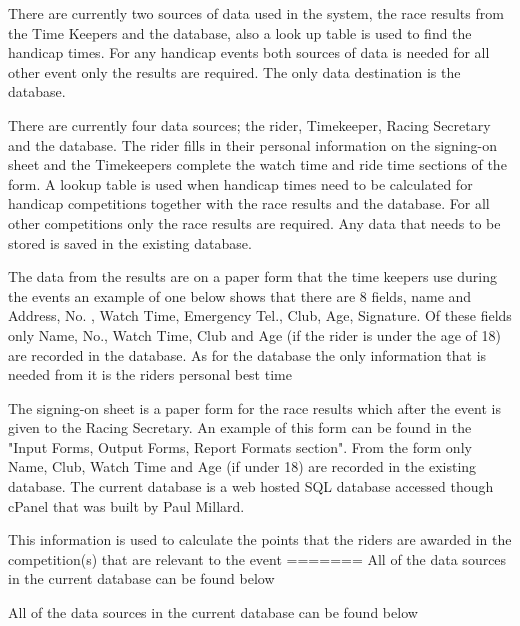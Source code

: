 There are currently two sources of data used in the system, the race results from the Time Keepers and the database, also a look up table is used to find the handicap times. For any handicap events both sources of data is needed for all other event only the results are required. The only data destination is the database.

There are currently four data sources; the rider, Timekeeper, Racing Secretary and the database. The rider fills in their personal information on the signing-on sheet and the Timekeepers complete the watch time and ride time sections of the form. A lookup table is used when handicap times need to be calculated for handicap competitions together with the race results and the database. For all other competitions only the race results are required. Any data that needs to be stored is saved in the existing database.

The data from the results are on a paper form that the time keepers use during the events an example of one below shows that there are 8 fields, name and Address, No. , Watch Time, Emergency Tel., Club, Age, Signature. Of these fields only Name, No., Watch Time, Club and Age (if the rider is under the age of 18) are recorded in the database. As for the database the only information that is needed from it is the riders personal best time

The signing-on sheet is a paper form for the race results which after the event is given to the Racing Secretary. An example of this form can be found  in the "Input Forms, Output Forms, Report Formats section". From the form only Name, Club, Watch Time and Age (if under 18) are recorded in the existing database. The current database is a web hosted SQL database accessed though cPanel that was built by Paul Millard. 

This information is used to calculate the points that the riders are awarded in the competition(s) that are relevant to the event
=======
All of the data sources in the current database can be found below

All of the data sources in the current database can be found below

